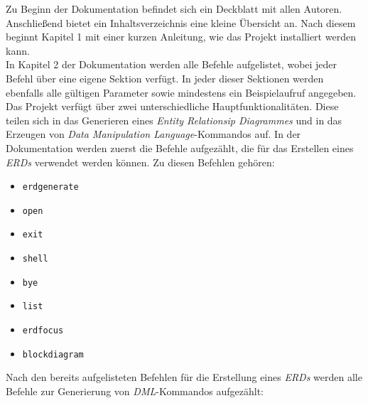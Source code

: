 \noindent
Zu Beginn der Dokumentation befindet sich ein Deckblatt mit allen Autoren. Anschließend bietet ein Inhaltsverzeichnis eine kleine Übersicht an. Nach diesem beginnt Kapitel 1 mit einer kurzen Anleitung, wie das Projekt installiert werden kann. 
\\

\noindent
In Kapitel 2 der Dokumentation werden alle Befehle aufgelistet, wobei jeder Befehl über eine eigene Sektion verfügt. In jeder dieser Sektionen werden ebenfalls alle gültigen Parameter sowie mindestens ein Beispielaufruf angegeben. 
\\

\noindent
Das Projekt verfügt über zwei unterschiedliche Hauptfunktionalitäten. Diese teilen sich in das Generieren eines \textit{Entity Relationsip Diagrammes} und in das Erzeugen von \textit{Data Manipulation Language}-Kommandos auf. In der Dokumentation werden zuerst die Befehle aufgezählt, die für das Erstellen eines \textit{ERDs} verwendet werden können. Zu diesen Befehlen gehören:
\\

\noindent
\begin{itemize}\pra
	\item{\verb|erdgenerate|} 
	
	\item \verb|open|
		
	\item \verb|exit| 
	
	\item \verb|shell| 
	
	\item \verb|bye|
	
	\item \verb|list|
	
	\item \verb|erdfocus|
	
	\item \verb|blockdiagram|
	\\
\end{itemize}

\noindent
Nach den bereits aufgelisteten Befehlen für die Erstellung eines \textit{ERDs} werden alle Befehle zur Generierung von \textit{DML}-Kommandos aufgezählt:
\\

